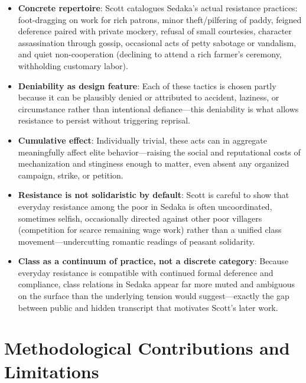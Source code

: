 \documentclass[12pt]{article}
\begin{document}
\begin{itemize}[leftmargin=*, itemsep=4pt]
    \item \textbf{Concrete repertoire}: Scott catalogues Sedaka's actual resistance practices: foot-dragging on work for rich patrons, minor theft/pilfering of paddy, feigned deference paired with private mockery, refusal of small courtesies, character assassination through gossip, occasional acts of petty sabotage or vandalism, and quiet non-cooperation (declining to attend a rich farmer's ceremony, withholding customary labor).
    \item \textbf{Deniability as design feature}: Each of these tactics is chosen partly because it can be plausibly denied or attributed to accident, laziness, or circumstance rather than intentional defiance---this deniability is what allows resistance to persist without triggering reprisal.
    \item \textbf{Cumulative effect}: Individually trivial, these acts can in aggregate meaningfully affect elite behavior---raising the social and reputational costs of mechanization and stinginess enough to matter, even absent any organized campaign, strike, or petition.
    \item \textbf{Resistance is not solidaristic by default}: Scott is careful to show that everyday resistance among the poor in Sedaka is often uncoordinated, sometimes selfish, occasionally directed against other poor villagers (competition for scarce remaining wage work) rather than a unified class movement---undercutting romantic readings of peasant solidarity.
    \item \textbf{Class as a continuum of practice, not a discrete category}: Because everyday resistance is compatible with continued formal deference and compliance, class relations in Sedaka appear far more muted and ambiguous on the surface than the underlying tension would suggest---exactly the gap between public and hidden transcript that motivates Scott's later work.
\end{itemize}

\section{Methodological Contributions and Limitations}
\end{document}
